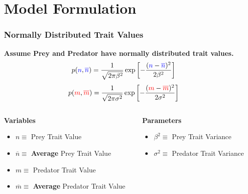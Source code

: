 \documentclass[10pt]{beamer}
\begin{document}
\section{Model Formulation}
\begin{frame}
	\frametitle{Normally Distributed Trait Values}
	{\bf Assume {\color{blue}Prey} and {\color{red}Predator} have normally distributed trait values.}
	\begin{align*}
		p({\color{blue}n}, {\color{blue}\overline{n}}) &= \frac{1}{\sqrt{2\pi\beta^2}}\exp\left[{-\frac{({\color{blue}n} - {\color{blue}\overline{n}})^2}{2\beta^2}}\right]
	\end{align*}
	\begin{align*}
		p({\color{red}m}, {\color{red}\overline{m}}) &= \frac{1}{\sqrt{2\pi\sigma^2}}\exp\left[{-\frac{({\color{red}m} - {\color{red}\overline{m}})^2}{2\sigma^2}}\right]
	\end{align*}
	\begin{columns}
		\begin{column}{0.50\textwidth}
			{\bf Variables}
			\begin{itemize}
				\item \footnotesize{\color{blue}$n \equiv $ Prey Trait Value}
				\item {\color{blue}$\overline{n} \equiv $ {\bf Average} Prey Trait Value}
				\item {\color{red}$m \equiv $ Predator Trait Value}
				\item {\color{red}$\overline{m} \equiv $ {\bf Average} Predator Trait Value}
			\end{itemize}
		\end{column}
		\begin{column}{0.42\textwidth}
			{\bf Parameters}
			\begin{itemize}
				\item \footnotesize$\beta^2 \equiv $ Prey Trait Variance
				\item $\sigma^2 \equiv $ Predator Trait Variance
			\end{itemize}
		\end{column}
	\end{columns}

\end{frame}
\end{document}
